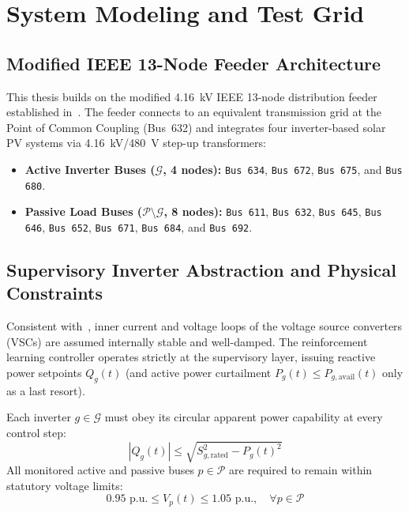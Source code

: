 \chapter{System Modeling and Test Grid}
\label{ch:system_modeling}

\section{Modified IEEE 13-Node Feeder Architecture}
This thesis builds on the modified 4.16~kV IEEE 13-node distribution feeder established in~\cite{Schulte2026,Mughni2026}. The feeder connects to an equivalent transmission grid at the Point of Common Coupling (Bus~632) and integrates four inverter-based solar PV systems via 4.16~kV/480~V step-up transformers:
\begin{itemize}
    \item \textbf{Active Inverter Buses ($\mathcal{G}$, 4 nodes):} \texttt{Bus 634}, \texttt{Bus 672}, \texttt{Bus 675}, and \texttt{Bus 680}.
    \item \textbf{Passive Load Buses ($\mathcal{P} \setminus \mathcal{G}$, 8 nodes):} \texttt{Bus 611}, \texttt{Bus 632}, \texttt{Bus 645}, \texttt{Bus 646}, \texttt{Bus 652}, \texttt{Bus 671}, \texttt{Bus 684}, and \texttt{Bus 692}.
\end{itemize}


\section{Supervisory Inverter Abstraction and Physical Constraints}
Consistent with~\cite{Schulte2026,Mughni2026}, inner current and voltage loops of the voltage source converters (VSCs) are assumed internally stable and well-damped. The reinforcement learning controller operates strictly at the supervisory layer, issuing reactive power setpoints $Q_g(t)$ (and active power curtailment $P_g(t) \le P_{g,\text{avail}}(t)$ only as a last resort).

Each inverter $g \in \mathcal{G}$ must obey its circular apparent power capability at every control step:
\begin{equation}
    |Q_g(t)| \le \sqrt{S_{g,\text{rated}}^2 - P_g(t)^2}
    \label{eq:apparent_power_limit}
\end{equation}
All monitored active and passive buses $p \in \mathcal{P}$ are required to remain within statutory voltage limits:
\begin{equation}
    0.95\text{ p.u.} \le V_p(t) \le 1.05\text{ p.u.}, \quad \forall p \in \mathcal{P}
    \label{eq:voltage_limits}
\end{equation}

